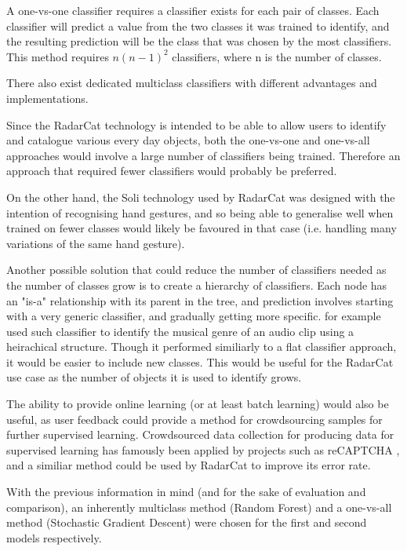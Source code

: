 \documentclass[12pt]{article}
\begin{document}
A one-vs-one classifier requires a classifier exists for each pair of classes. Each classifier will predict a value from the two classes it was trained to identify, and the resulting prediction will be the class that was chosen by the most classifiers. This method requires $n (n - 1)^2$ classifiers, where n is the number of classes.

There also exist dedicated multiclass classifiers with different advantages and implementations.

Since the RadarCat \cite{radarcat} technology is intended to be able to allow users to identify and catalogue various every day objects, both the one-vs-one and one-vs-all approaches would involve a large number of classifiers being trained. Therefore an approach that required fewer classifiers would probably be preferred. 

On the other hand, the Soli \cite{soli} technology used by RadarCat was designed with the intention of recognising hand gestures, and so being able to generalise well when trained on fewer classes would likely be favoured in that case (i.e. handling many variations of the same hand gesture).

Another possible solution that could reduce the number of classifiers needed as the number of classes grow is to create a hierarchy of classifiers. Each node has an "is-a" relationship with its parent in the tree, and prediction involves starting with a very generic classifier, and gradually getting more specific. \cite{heirarchy} for example used such classifier to identify the musical genre of an audio clip using a heirachical structure. Though it performed similiarly to a flat classifier approach, it would be easier to include new classes. This would be useful for the RadarCat use case as the number of objects it is used to identify grows.

The ability to provide online learning (or at least batch learning) would also be useful, as user feedback could provide a method for crowdsourcing samples for further supervised learning. Crowdsourced data collection for producing data for supervised learning has famously been applied by projects such as reCAPTCHA \cite{captcha}, and a similiar method could be used by RadarCat to improve its error rate.

With the previous information in mind (and for the sake of evaluation and comparison), an inherently multiclass method (Random Forest) and a one-vs-all method (Stochastic Gradient Descent) were chosen for the first and second models respectively. 
\end{document}
